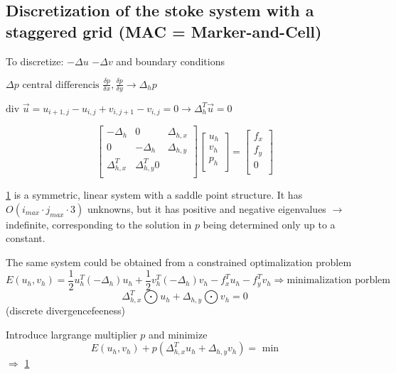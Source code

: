 \documentclass[a4paper,11pt]{scrartcl}
\begin{document}
\subsection*{Discretization of the stoke system with a staggered grid (MAC = Marker-and-Cell)}
To discretize:
$- \Delta u$%
$- \Delta v$%
and boundary conditions

$\Delta p \text{ central differencis } \frac{\delta p}{\delta x}, \frac{\delta p}{\delta y} \rightarrow \Delta_h p$

$\text{div }\vec{u} = u_{i+1,j} - u_{i,j} +v_{i,j+1} - v_{i,j} = 0 \rightarrow \Delta_h^T \vec{u} = 0$

\begin{figure}[H]
	\centering
	\[ \left[ \begin{matrix}
	-\Delta_h & 0 & \Delta_{h,x} \\
	0 & -\Delta_h & \Delta_{h,y} \\
	\Delta_{h,x}^T & \Delta_{h,y}^T 0\\
	\end{matrix} \right] 
	\left[
	\begin{matrix}
	u_h \\
	v_h \\
	p_h\\
	\end{matrix} \right] = \left[ \begin{matrix}
	f_x \\ f_y \\ 0 \\
	\end{matrix} \right] \]%
	\renewcommand{\thefigure}{S14} %
	\caption{}
	\label{fig:disc-stokes}
\end{figure}
\ref{fig:disc-stokes} is a symmetric, linear system with a saddle point structure. It has $O(i_{max}\cdot j_{max}\cdot 3)$ unknowns, but it has positive and negative eigenvalues $\rightarrow$ indefinite, corresponding to the solution in $p$ being determined only up to a constant.

The same system could be obtained from a constrained optimalization problem
\[ E(u_h, v_h) = \frac{1}{2}u_h^T(-\Delta_h)u_h + \frac{1}{2}v_h^T(-\Delta_h)v_h - f_x^T u_h - f_y^T v_h\Rightarrow \text{minimalization porblem}\]
\[ \Delta_{h,x}^T \bigodot u_h + \Delta_{h,y} \bigodot v_h = 0\] (discrete divergencefeeness)%

Introduce largrange multiplier $p$ and minimize
\[ E(u_h,v_h) + p(\Delta_{h,x}^T u_h + \Delta_{h,y} v_h) = \text{ min} \]
$\Rightarrow$ \ref{fig:disc-stokes}
\end{document}
